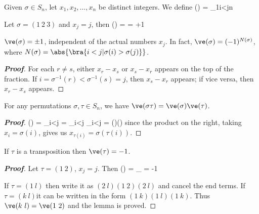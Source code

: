 \begin{definition}
Given $\sigma \in S_n$, let $x_1,x_2,\dots,x_n$ be distinct integers. We define%
\be
\ve(\sigma) = \prod_{1\leq i<j\leq n} 
\ee
\end{definition}

\begin{example}
Let $\sigma = (1\ 2\ 3)$ and $x_j = j$, then
\be
\ve(\sigma) =  \times {} \times {} = +1
\ee
\end{example}

\begin{lemma}
$\ve(\sigma) = \pm 1$, independent of the actual numbers $x_j$. In fact, $\ve(\sigma) = (-1)^{N(\sigma)}$, where $N(\sigma) = \abs{\bra{i<j|\sigma(i)>\sigma(j)}}$.
\end{lemma}

\begin{proof}[\bf Proof]
For each $r\neq s$, either $x_r - x_s$ or $x_s - x_r$ appears on the top of the fraction. If $i = \sigma^{-1}(r) < \sigma^{-1}(s) = j$, then $x_s - x_r$ appears; if vice versa, then $x_r - x_s$ appears.
\end{proof}

\begin{lemma}\label{lem:permutation_sign_product}
For any permutations $\sigma,\tau \in S_n$, we have $\ve(\sigma \tau) = \ve(\sigma)\ve(\tau)$.
\end{lemma}
\begin{proof}[\bf Proof]
\be
\ve(\sigma \tau) = \prod_{i<j}  = \prod_{i<j}  \prod_{i<j}  = \ve(\sigma)\ve(\tau)
\ee
since the product on the right, taking $x_i = \sigma(i)$, gives us $x_{\tau(i)} = \sigma(\tau(i))$.
\end{proof}

\begin{lemma}\label{lem:transposition_sign_minus_one}
If $\tau$ is a transposition then $\ve(\tau) = -1$.
\end{lemma}

\begin{proof}[\bf Proof]
Let $\tau = (1\ 2)$, $x_j =j$. Then
\be
\ve(\tau) =  \times {}_{} = -1
\ee

If $\tau = (1\ l)$ then write it as $(2\ l)(1\ 2)(2\ l)$ and cancel the end terms. If $\tau = (k\ l) $it can be written in the form $(1\ k)(1\ l)(1\ k)$. Thus $\ve(k\ l) = \ve(1\ 2)$ and the lemma is proved.
\end{proof}

